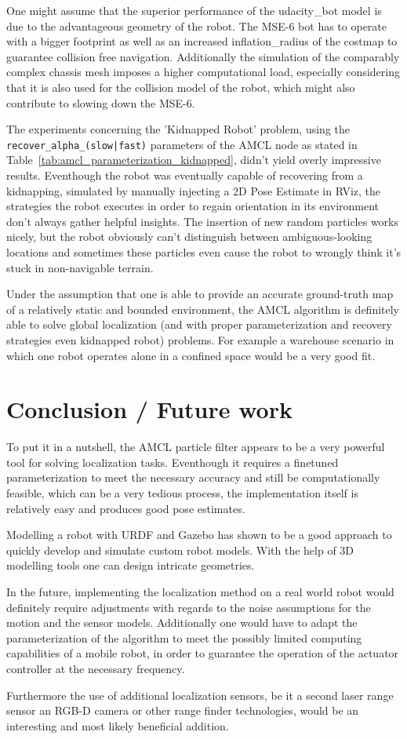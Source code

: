 \documentclass[10pt,journal,compsoc]{IEEEtran}
\begin{document}
One might assume that the superior performance of the udacity\_bot model is due to the advantageous geometry of the robot. The MSE-6 bot has to operate with a bigger footprint as well as an increased inflation\_radius of the costmap to guarantee collision free navigation. 
Additionally the simulation of the comparably complex chassis mesh imposes a higher computational load, especially considering that it is also used for the collision model of the robot, which might also contribute to slowing down the MSE-6.

The experiments concerning the 'Kidnapped Robot' problem, using the \texttt{recover\_alpha\_(slow|fast)} parameters of the AMCL node as stated in Table~\ref{tab:amcl_parameterization_kidnapped}, didn't yield overly impressive results. Eventhough the robot was eventually capable of recovering from a kidnapping, simulated by manually injecting a 2D Pose Estimate in RViz, the strategies the robot executes in order to regain orientation in its environment don't always gather helpful insights.
The insertion of new random particles works nicely, but the robot obviously can't distinguish between ambiguous-looking locations and sometimes these particles even cause the robot to wrongly think it's stuck in non-navigable terrain.

Under the assumption that one is able to provide an accurate ground-truth map of a relatively static and bounded environment, the AMCL algorithm is definitely able to solve global localization (and with proper parameterization and recovery strategies even kidnapped robot) problems. For example a warehouse scenario in which one robot operates alone in a confined space would be a very good fit.

\section{Conclusion / Future work}

To put it in a nutshell, the AMCL particle filter appears to be a very powerful tool for solving localization tasks. Eventhough it requires a finetuned parameterization to meet the necessary accuracy and still be computationally feasible, which can be a very tedious process, the implementation itself is relatively easy and produces good pose estimates.

Modelling a robot with URDF and Gazebo has shown to be a good approach to quickly develop and simulate custom robot models. With the help of 3D modelling tools one can design intricate geometries.

In the future, implementing the localization method on a real world robot would definitely require adjustments with regards to the noise assumptions for the motion and the sensor models. Additionally one would have to adapt the parameterization of the algorithm to meet the possibly limited computing capabilities of a mobile robot, in order to guarantee the operation of the actuator controller at the necessary frequency.

Furthermore the use of additional localization sensors, be it a second laser range sensor an RGB-D camera or other range finder technologies, would be an interesting and most likely beneficial addition.




\end{document}
